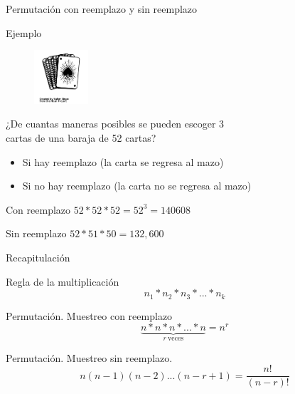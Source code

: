 \documentclass{beamer}
\begin{document}
\begin{frame}{Permutación con reemplazo y sin reemplazo}
  \begin{exampleblock}{Ejemplo}
    \begin{figure}
      \raggedleft
      \includegraphics[width=2cm,angle=0,trim={1mm 250mm 1mm 310mm},clip]{figures/deck-of-cards.png}
    \end{figure}

    ¿De cuantas maneras posibles se pueden escoger 3 
    \\cartas de una baraja de 52
    cartas?
    \begin{itemize}
      \item Si hay reemplazo (la carta se regresa al mazo)
      \item Si no hay reemplazo (la carta no se regresa al mazo)
    \end{itemize}
  \end{exampleblock}

  \begin{exampleblock}{Con reemplazo}
    \centering
    $52*52*52 = 52^{3} = 140 608$
  \end{exampleblock}

  \begin{exampleblock}{Sin reemplazo}
    \centering
    $52*51*50 = 132,600$
  \end{exampleblock}

\end{frame}

\begin{frame}{Recapitulación}
  \begin{block}{Regla de la multiplicación}
    \begin{equation}
      n_1*n_2*n_3*...*n_k
    \end{equation}
  \end{block}

  \begin{block}{Permutación. Muestreo con reemplazo}
    \begin{equation}
      \underbrace{n*n*n*...*n}_{r \ \text{veces}} = n^r
    \end{equation}
  \end{block}

  \begin{block}{Permutación. Muestreo sin reemplazo.}
    \begin{equation}
      n(n-1)(n-2)...(n-r+1) = \frac {n!}{(n-r)!}
    \end{equation}
  \end{block}

\end{frame}
\end{document}

